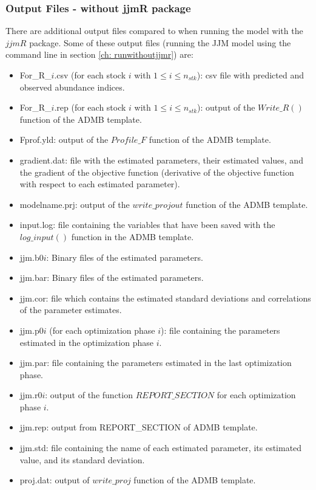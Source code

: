 \documentclass{article}
\begin{document}
\subsubsection{Output Files - without jjmR package}
There are additional output files compared to when running the model with the $jjmR$ package. Some of these output files (running the JJM model using the command line in section \ref{ch: runwithoutjjmr}) are:
\begin{itemize}
    \item For\_R\_$i$.csv (for each stock $i$ with $1\leq i \leq n_{stk}$): csv file with  predicted and observed  abundance indices.
    \item For\_R\_$i$.rep (for each stock $i$ with $1\leq i \leq n_{stk}$): output of the  $Write\_R()$ function of the ADMB template.
    \item Fprof.yld: output of the $Profile\_F$ function of the ADMB template. 
    \item gradient.dat: file with the estimated parameters, their estimated values, and the gradient of the objective function (derivative of the objective function with respect to each estimated parameter).
    \item modelname.prj: output of the $write\_projout$ function of the ADMB template. 
    \item input.log: file containing the variables that have been saved with the $log\_input()$ function in the ADMB template.
    \item jjm.b0$i$: Binary files of the estimated parameters.
    \item jjm.bar: Binary files of the estimated parameters.
    \item jjm.cor: file which contains the estimated standard deviations and correlations of the parameter estimates.
    \item jjm.p0$i$ (for each optimization phase $i$): file containing the parameters estimated in the optimization phase $i$.
    \item jjm.par: file containing the parameters estimated in the last optimization phase.
    \item jjm.r0$i$: output of the function $REPORT\_SECTION$ for each optimization phase $i$.
    \item jjm.rep: output from REPORT\_SECTION of ADMB template.
    \item jjm.std: file containing the name of each estimated parameter, its estimated value, and its standard deviation.
    \item proj.dat: output of $write\_proj$ function of the ADMB template.
\end{itemize}
\end{document}
